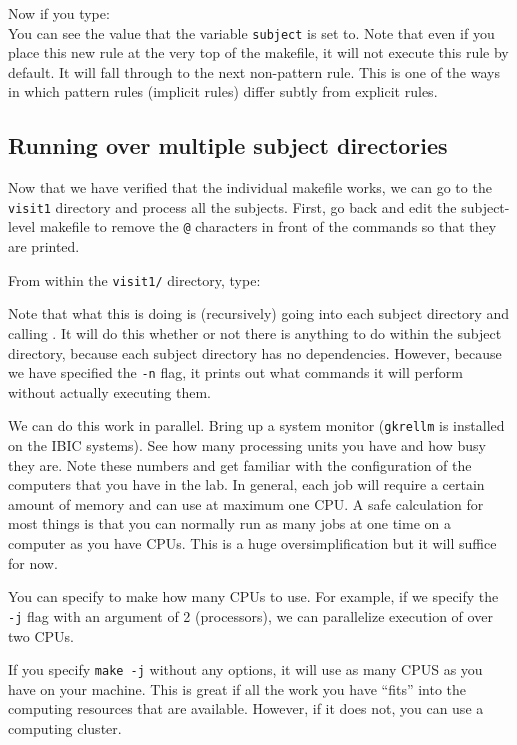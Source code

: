 Now if you type:  \\
You can see the value that the variable \texttt{subject} is set to. Note that even if you place this new rule at the very top of the makefile, it will not execute this rule by default. It will fall through to the next non-pattern rule. This is one of the ways in which pattern rules (implicit rules) differ subtly from explicit rules. 

\subsection{Running \maken{} over multiple subject directories}
Now that we have verified that the individual makefile works, we can
go to the \texttt{visit1} directory and process all the
subjects. First, go back and edit the subject-level makefile to remove
the \texttt{@} characters in front of the commands so that they are
printed.

From within the \texttt{visit1/} directory, type:

Note that what this is doing is (recursively) going into each subject directory and calling \maken{}. It will do this whether or not there is anything to do within the subject directory, because each subject directory has no dependencies. However, because we have specified the \texttt{-n} flag, it prints out what commands it will perform without actually executing them.

We can do this work in parallel. Bring up a system monitor (\texttt{gkrellm} is installed on the IBIC systems). See how many processing units you have and how busy they are. Note these numbers and get familiar with the configuration of the computers that you have in the lab. In general, each job will require a certain amount of memory and can use at maximum one CPU. A safe calculation for most things is that you can normally run as many jobs at one time on a computer as you have CPUs. This is a huge oversimplification but it will suffice for now. 

You can specify to make how many CPUs to use. For example, if we specify the \texttt{ -j} flag with an argument of 2 (processors), we can parallelize execution of \maken{} over two CPUs. 

If you specify \texttt{make -j} without any options, it will use as many CPUS as  you have on your machine. This is great if all the work you have ``fits'' into the computing resources that are available. However, if it does not, you can use a computing cluster.

